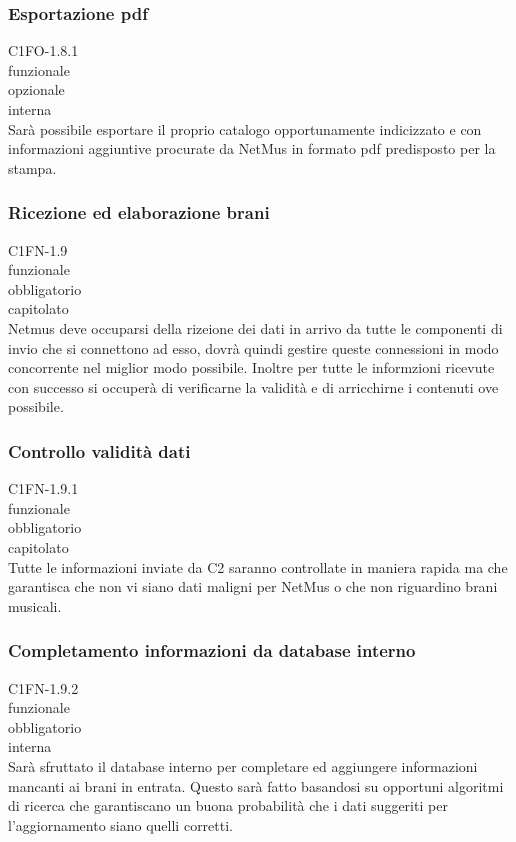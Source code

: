 \subsubsection*{Esportazione pdf}
 C1FO-1.8.1 \\
 funzionale \\
 opzionale \\
 interna \\
Sar\`a possibile esportare il proprio catalogo opportunamente indicizzato e con
informazioni aggiuntive procurate da NetMus in formato pdf predisposto per la stampa.

\subsubsection*{Ricezione ed elaborazione brani}
 C1FN-1.9 \\
 funzionale \\
 obbligatorio \\
 capitolato \\
Netmus deve occuparsi della rizeione dei dati in arrivo da tutte le componenti
di invio che si connettono ad esso, dovr\`a quindi gestire queste connessioni in
modo concorrente nel miglior modo possibile. Inoltre per tutte le informzioni
ricevute con successo si occuper\`a di verificarne la validit\`a e di arricchirne i
contenuti ove possibile.

\subsubsection*{Controllo validit\`a dati}
 C1FN-1.9.1 \\
 funzionale \\
 obbligatorio \\
 capitolato \\
Tutte le informazioni inviate da C2 saranno controllate in maniera
rapida ma che garantisca che non vi siano dati maligni per NetMus o che non
riguardino brani musicali.

\subsubsection*{Completamento informazioni da database interno}
 C1FN-1.9.2 \\
 funzionale \\
 obbligatorio \\
 interna \\
Sar\`a sfruttato il database interno per completare ed aggiungere informazioni
mancanti ai brani in entrata. Questo sar\`a fatto basandosi su opportuni algoritmi
di ricerca che garantiscano un buona probabilit\`a che i dati suggeriti per
l'aggiornamento siano quelli corretti.


